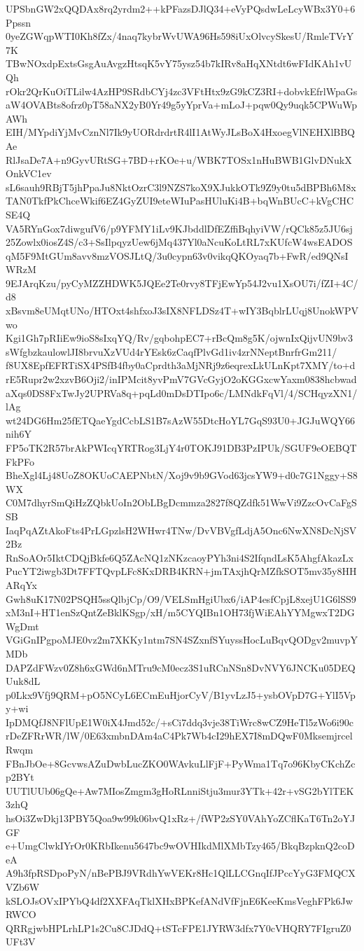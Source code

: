 UPSbnGW2xQQDAx8rq2yrdm2++kPFazsDJlQ34+eVyPQsdwLeLcyWBx3Y0+6Ppssn
0yeZGWqpWTI0Kh8fZx/4naq7kybrWvUWA96Hs598iUxOlvcySkesU/RmleTVrY7K
TBwNOxdpExtsGsgAuAvgzHtsqK5vY75ysz54b7kIRv8aHqXNtdt6wFIdKAh1vUQh
rOkr2QrKuOiTLilw4AzHP9SRdbCYj4zc3VFtHtx9zG9kCZ3RI+dobvkEfrlWpaGs
aW4OVABts8ofrz0pT58aNX2yB0Yr49g5yYprVa+mLoJ+pqw0Qy9uqk5CPWuWpAWh
EIH/MYpdiYjMvCznNl7Ik9yUORdrdrtR4lI1AtWyJLsBoX4HxoegVlNEHXlBBQAe
RlJsaDe7A+n9GyvURtSG+7BD+rKOe+u/WBK7TOSx1nHuBWB1GlvDNukXOnkVC1ev
sL6sauh9RBjT5jhPpaJu8NktOzrC3l9NZS7koX9XJukkOTk9Z9y0tu5dBPBh6M8x
TAN0TkfPkChceWkif6EZ4GyZUI9eteWIuPasHUluKi4B+bqWnBUcC+kVgCHCSE4Q
VA5RYnGox7diwgufV6/p9YFMY1iLv9KJbddlDfEZffiBqhyiVW/rQCk85z5JU6sj
25Zowlx0iosZ4S/c3+SsIlpqyzUew6jMq437Yl0aNcuKoLtRL7xKUfcW4wsEADOS
qM5F9MtGUm8avv8mzVOSJLtQ/3u0cypn63v0vikqQKOyaq7b+FwR/ed9QNsIWRzM
9EJArqKzu/pyCyMZZHDWK5JQEe2Te0rvy8TFjEwYp54J2vu1XsOU7i/fZI+4C/d8
xBsvm8eUMqtUNo/HTOxt4shfxoJ3sIX8NFLDSz4T+wIY3BqblrLUqj8UnokWPVwo
Kgi1Gh7pRIiEw9ioS8sIxqYQ/Rv/gqbohpEC7+rBcQm8g5K/ojwnIxQijvUN9bv3
sWfgbzkaulowlJI8brvuXzVUd4rYEsk6zCaqfPlvGd1iv4zrNNeptBnrfrGm211/
f8UX8EpfEFRTiSX4PSfB4fby0aCprdth3aMjNRj9z6eqrexLkULnKpt7XMY/to+d
rE5Rupr2w2xzvB6Oji2/inIPMcit8yvPmV7GVcGyjO2oKGGxcwYaxm0838hcbwad
aXqs0DS8FxTwJy2UPRVa8q+pqLd0mDsDTIpo6c/LMNdkFqVl/4/SCHqyzXN1/lAg
wt24DG6Hm25fETQaeYgdCcbLS1B7sAzW55DtcHoYL7GqS93U0+JGJuWQY66nih6Y
FP5oTK2R57brAkPWIcqYRTRog3LjY4r0TOKJ91DB3PzIPUk/SGUF9eOEBQTFkPFo
BheXgl4Lj48UoZ8OKUoCAEPNbtN/Xoj9v9b9GVod63jcsYW9+d0c7G1Nggy+S8WX
C0M7dhyrSmQiHzZQbkUoIn2ObLBgDcmmza2827f8QZdfk51WwVi9ZzcOvCaFgSSB
IaqPqAZtAkoFts4PrLGpzlsH2WHwr4TNw/DvVBVgfLdjA5Onc6NwXN8DcNjSV2Bz
RnSoAOr5IktCDQjBkfe6Q5ZAcNQ1zNKzcaoyPYh3ni4S2IfqndLsK5AhgfAkazLx
PucYT2iwgb3Dt7FFTQvpLFc8KxDRB4KRN+jmTAxjhQrMZfkSOT5mv35y8HHARqYx
Gwh8uK17N02PSQH5ssQlbjCp/O9/VELSmHgiUbx6/iAP4esfCpjL8xejU1G6lSS9
xM3nI+HT1enSzQntZeBklKSgp/xH/m5CYQIBn1OH73fjWiEAhYYMgwxT2DGWgDmt
VGiGnIPgpoMJE0vz2m7XKKy1ntm7SN4SZxnfSYuyssHocLuBqvQODgv2muvpYMDb
DAPZdFWzv0Z8h6xGWd6nMTru9cM0ecz3S1uRCnNSn8DvNVY6JNCKu05DEQUuk8dL
p0Lkx9Vfj9QRM+pO5NCyL6ECmEuHjorCyV/B1yvLzJ5+ysbOVpD7G+YlI5Vpy+wi
IpDMQfJ8NFlUpE1W0iX4Jmd52c/+sCi7ddq3vje38TiWrc8wCZ9HeTl5zWo6i90c
rDeZFRrWR/lW/0E63xmbnDAm4aC4Pk7Wb4cI29hEX7I8mDQwF0MksemjrcelRwqm
FBnJbOe+8GcvwsAZuDwbLucZKO0WAvkuLlFjF+PyWma1Tq7o96KbyCKchZcp2BYt
UUTlUUb06gQe+Aw7MIosZmgm3gHoRLnniStju3mur3YTk+42r+vSG2bYlTEK3zhQ
hsOi3ZwDkj13PBY5Qoa9w99k06bvQ1xRz+/fWP2zSY0VAhYoZCflKaT6Tn2oYJGF
e+UmgClwkIYrOr0KRbIkenu5647bc9wOVHIkdMlXMbTzy465/BkqBzpknQ2coDeA
A9h3fpRSDpoPyN/nBePBJ9VRdhYwVEKr8Hc1QlLLCGnqIfJPccYyG3FMQCXVZb6W
kSLOJsOVxIPYbQ4df2XXFAqTklXHxBPKefANdVfFjnE6KeeKmsVeghFPk6JwRWCO
QRRgjwbHPLrhLP1s2Cu8CJDdQ+tSTcFPE1JYRW3dfx7Y0cVHQRY7FIgruZ0UFt3V
